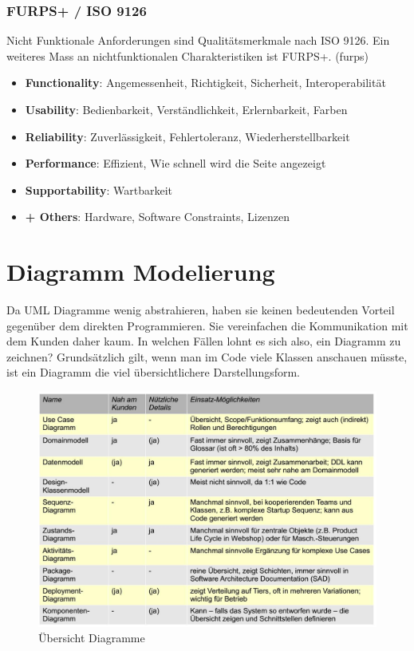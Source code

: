 \subsubsection{FURPS+ / ISO 9126}
Nicht Funktionale Anforderungen sind Qualitätsmerkmale nach ISO 9126. Ein weiteres Mass an nichtfunktionalen Charakteristiken ist FURPS+. (\gls{furps})
\begin{itemize}
	\item \textbf{Functionality}: Angemessenheit, Richtigkeit, Sicherheit, Interoperabilität
	\item \textbf{Usability}: Bedienbarkeit, Verständlichkeit, Erlernbarkeit, Farben
	\item \textbf{Reliability}: Zuverlässigkeit, Fehlertoleranz, Wiederherstellbarkeit
	\item \textbf{Performance}: Effizient, Wie schnell wird die Seite angezeigt
	\item \textbf{Supportability}: Wartbarkeit
	\item \textbf{+ Others}: Hardware, Software Constraints, Lizenzen
\end{itemize}

\section{Diagramm Modelierung}
Da UML Diagramme wenig abstrahieren, haben sie keinen bedeutenden Vorteil gegenüber dem direkten Programmieren. Sie vereinfachen die Kommunikation mit dem Kunden daher kaum. In welchen Fällen lohnt es sich also, ein Diagramm zu zeichnen? Grundsätzlich gilt, wenn man im Code viele Klassen anschauen müsste, ist ein Diagramm die viel übersichtlichere Darstellungsform.

\begin{figure}[h]
	\centering
	\includegraphics[width=0.9\linewidth]{images/uebersicht_diagramme}
	\caption{Übersicht Diagramme}
	\label{fig:uebersichtdiagramme}
\end{figure}

